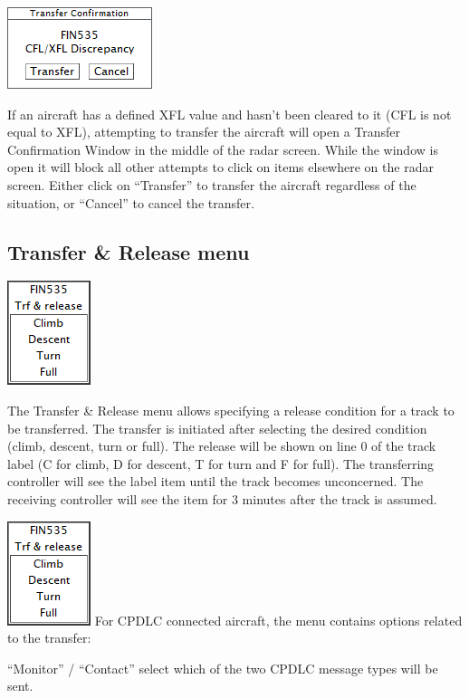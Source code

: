 \documentclass[11pt,a4paper]{memoir}
\begin{document}
\includegraphics{img/xfrconfirm.png}

If an aircraft has a defined XFL value and hasn’t been cleared to it (CFL is not equal to XFL), attempting to transfer the aircraft will open a Transfer Confirmation Window in the middle of the radar screen. While the window is open it will block all other attempts to click on items elsewhere on the radar screen. Either click on “Transfer” to transfer the aircraft regardless of the situation, or “Cancel” to cancel the transfer.

\subsection{Transfer \& Release menu}
\label{menu:xfrrel}

\includegraphics{img/xfrrel.png}

The Transfer \& Release menu allows specifying a release condition for a track to be transferred. The transfer is initiated after selecting the desired condition (climb, descent, turn or full). The release will be shown on line 0 of the track label (C for climb, D for descent, T for turn and F for full). The transferring controller will see the label item until the track becomes unconcerned. The receiving controller will see the item for 3 minutes after the track is assumed.

\includegraphics{img/xfrrel.png}
For CPDLC connected aircraft, the menu contains options related to the transfer:

“Monitor” / “Contact” select which of the two CPDLC message types will be sent.
\end{document}
